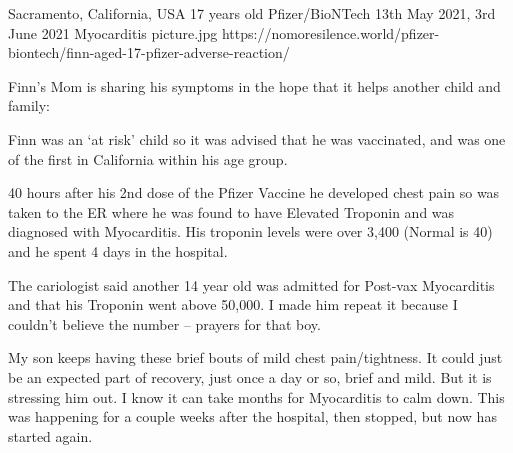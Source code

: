 {Sacramento, California, USA}
{17 years old}
{Pfizer/BioNTech}
{13th May 2021, 3rd June 2021}
{Myocarditis}
{picture.jpg}
{https://nomoresilence.world/pfizer-biontech/finn-aged-17-pfizer-adverse-reaction/}
{

Finn’s Mom is sharing his symptoms in the hope that it helps another child and
family:

Finn was an ‘at risk’ child so it was advised that he was vaccinated, and was
one of the first in California within his age group.

40 hours after his 2nd dose of the Pfizer Vaccine he developed chest pain so was
taken to the ER where he was found to have Elevated Troponin and was diagnosed
with Myocarditis. His troponin levels were over 3,400 (Normal is 40) and he
spent 4 days in the hospital.

The cariologist said another 14 year old was admitted for Post-vax Myocarditis
and that his Troponin went above 50,000. I made him repeat it because I couldn’t
believe the number – prayers for that boy.

My son keeps having these brief bouts of mild chest pain/tightness. It could
just be an expected part of recovery, just once a day or so, brief and mild. But
it is stressing him out. I know it can take months for Myocarditis to calm
down. This was happening for a couple weeks after the hospital, then stopped,
but now has started again.

}
